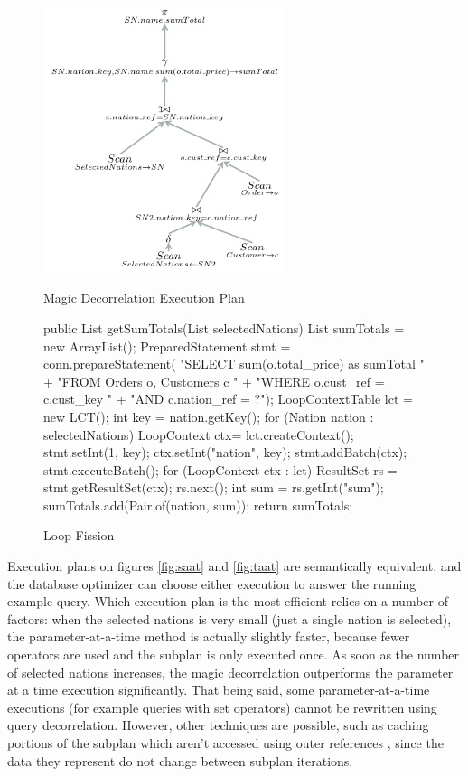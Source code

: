 \begin{figure}[h]
\begin{minipage}{0.45\textwidth}
\includegraphics[width=7cm]{images/MagicDecorrelation}
\caption{Magic Decorrelation Execution Plan}
\label{fig:magic}\hfill
\end{minipage}
\begin{minipage}{0.45\textwidth}
\centering
\begin{Java}[basicstyle=\small]
public List getSumTotals(List selectedNations) {
List sumTotals = new ArrayList();
PreparedStatement stmt = conn.prepareStatement( "SELECT sum(o.total_price) as sumTotal "
       + "FROM Orders o, Customers c "
       + "WHERE o.cust_ref = c.cust_key "
       + "AND c.nation_ref = ?");
LoopContextTable lct = new LCT();
int key = nation.getKey();
for (Nation nation : selectedNations) {
    LoopContext ctx= lct.createContext();
    stmt.setInt(1, key);
    ctx.setInt("nation", key);
    stmt.addBatch(ctx);
}
stmt.executeBatch();
for (LoopContext ctx : lct) {
    ResultSet rs = stmt.getResultSet(ctx);
    rs.next();
    int sum = rs.getInt("sum");
    sumTotals.add(Pair.of(nation, sum));
}
return sumTotals;
}
\end{Java}
\caption{Loop Fission}
\label{fig:loopfission}
\end{minipage}
\end{figure}

Execution plans on figures \ref{fig:saat} and \ref{fig:taat} are semantically equivalent, and the database optimizer can choose either execution to answer the running example query. Which execution plan is the most efficient relies on a number of factors: when the selected nations is very small (just a single nation is selected), the parameter-at-a-time method is actually slightly faster, because fewer operators are used and the subplan is only executed once. As soon as the number of selected nations increases, the magic decorrelation outperforms the parameter at a time execution significantly. That being said, some parameter-at-a-time executions (for example queries with set operators) cannot be rewritten \cite{pirahesh:1992aa} using query decorrelation. However, other techniques are possible, such as caching portions of the subplan which aren't accessed using outer references \cite{rao:1998aa}, since the data they represent do not change between subplan iterations.


